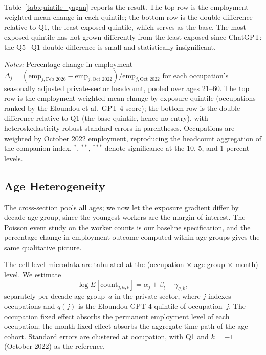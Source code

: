 \documentclass[12pt]{article}
\begin{document}
Table~\ref{tab:quintile_yagan} reports the result. The top row is the employment-weighted mean change in each quintile; the bottom row is the double difference relative to Q1, the least-exposed quintile, which serves as the base. The most-exposed quintile has not grown differently from the least-exposed since ChatGPT: the Q5$-$Q1 double difference is small and statistically insignificant.

\begin{table}[tp]
  \centering
  \caption{Employment change by AI-exposure quintile, October 2022 to February 2026, all ages 21--60, private sector, seasonally adjusted.}
  \label{tab:quintile_yagan}
  
  \begin{minipage}{\textwidth}\footnotesize\textit{Notes:} Percentage change in employment $\Delta_j = (\text{emp}_{j,\text{Feb }2026}-\text{emp}_{j,\text{Oct }2022})/\text{emp}_{j,\text{Oct }2022}$ for each occupation's seasonally adjusted private-sector headcount, pooled over ages 21--60. The top row is the employment-weighted mean change by exposure quintile (occupations ranked by the Eloundou et al.\ GPT-4 score); the bottom row is the double difference relative to Q1 (the base quintile, hence no entry), with heteroskedasticity-robust standard errors in parentheses. Occupations are weighted by October 2022 employment, reproducing the headcount aggregation of the companion index. $^{*}$, $^{**}$, $^{***}$ denote significance at the 10, 5, and 1 percent levels.\end{minipage}
\end{table}

\subsection{Age Heterogeneity}\label{sec:regression:age}

The cross-section pools all ages; we now let the exposure gradient differ by decade age group, since the youngest workers are the margin of interest. The Poisson event study on the worker counts is our baseline specification, and the percentage-change-in-employment outcome computed within age groups gives the same qualitative picture.

The cell-level microdata are tabulated at the (occupation $\times$ age group $\times$ month) level. We estimate
\[
\log E[\text{count}_{j,a,t}] = \alpha_{j} + \beta_{t} + \gamma_{q,k},
\]
separately per decade age group~$a$ in the private sector, where $j$ indexes occupations and $q(j)$ is the Eloundou GPT-4 quintile of occupation~$j$. The occupation fixed effect absorbs the permanent employment level of each occupation; the month fixed effect absorbs the aggregate time path of the age cohort. Standard errors are clustered at occupation, with Q1 and $k=-1$ (October 2022) as the reference.
\end{document}
